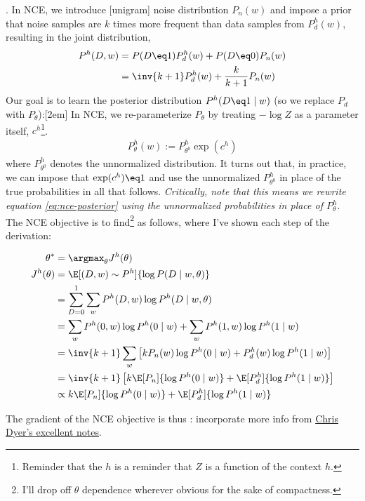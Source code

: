 \documentclass[11pt]{article}
\begin{document}
. In NCE, we introduce [unigram] noise distribution $P_n(w)$ and impose a prior that noise samples are $k$ times more frequent than data samples from $P_d^h(w)$, resulting in the joint distribution,
\begin{align}
P^h(D, w) 
&= P(D \eq 1) P_d^h(w) + P(D \eq 0) P_n(w) \\
&= \inv{k+1} P_d^h(w) + \frac{k}{k+1} P_n(w) 
\end{align}
Our goal is to learn the posterior distribution $P^h(D \eq 1 \mid w)$ (so we replace $P_d$ with $P_{\theta}$):[2em]
In NCE, we re-parameterize $P_{\theta}$ by treating $-\log Z$ as a parameter itself, $c^h$\footnote{Reminder that the $h$ is a reminder that $Z$ is a function of the context $h$.}. 
\begin{align}
P_{\theta}^h(w) := P_{\theta^0}^h \exp(c^h)
\end{align}
where $P_{\theta^0}^h$ denotes the unnormalized distribution. It turns out that, in practice, we can impose that $\exp(c^h) \eq 1$ and use the unnormalized $P^h_{\theta^0}$ in place of the true probabilities in all that follows. \textit{Critically, note that this means we rewrite equation \ref{eq:nce-posterior} using the unnormalized probabilities in place of $P_{\theta}^h$}. The NCE objective is to find\footnote{I'll drop off $\theta$ dependence wherever obvious for the sake of compactness.} as follows, where I've shown each step of the derivation:
\begin{small}
	\begin{align}
	\theta^* 
	&= \argmax_{\theta} J^h(\theta) \\
	J^h(\theta)
	&= \E[(D,w) \sim P^h]{\log P(D \mid w, \theta)} \\
	&= \sum_{D=0}^{1} \sum_w P^h(D, w) \log P^h(D \mid w, \theta) \\
	&= \sum_w  P^h(0, w) \log P^h(0 \mid w)   + \sum_w  P^h(1, w) \log P^h(1 \mid w) \\
	&= \inv{k+1} \sum_w \left[
	k P_n(w) \log P^h(0 \mid w) 
	+ P_d^h(w) \log P^h(1 \mid w)
	\right] \\
	&= \inv{k+1} \left[
	k \E[P_n]{\log P^h(0 \mid w)}
	+ \E[P^h_d]{\log P^h(1 \mid w)}
	\right] \\
	&\propto k \E[P_n]{\log P^h(0 \mid w)}
	+ \E[P^h_d]{\log P^h(1 \mid w)}
	\end{align}
\end{small}
The gradient of the NCE objective is thus
: incorporate more info from \href{http://demo.clab.cs.cmu.edu/cdyer/nce_notes.pdf}{Chris Dyer's excellent notes}.
\end{document}
